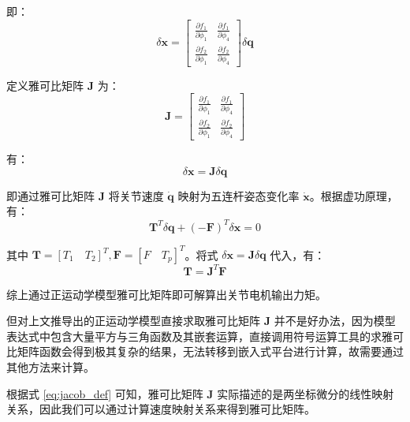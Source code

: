 即：
\begin{equation}
    \delta \boldsymbol{x} = 
    \begin{bmatrix}
        \frac{\partial f_1}{\partial \phi_1} & \frac{\partial f_1}{\partial \phi_4} \\
        \frac{\partial f_2}{\partial \phi_1} & \frac{\partial f_2}{\partial \phi_4}
    \end{bmatrix} \delta \boldsymbol{q}
\end{equation}

定义雅可比矩阵 $\boldsymbol{J}$ 为：
\begin{equation}
    \boldsymbol{J} = 
    \begin{bmatrix}
        \frac{\partial f_1}{\partial \phi_1} & \frac{\partial f_1}{\partial \phi_4} \\
        \frac{\partial f_2}{\partial \phi_1} & \frac{\partial f_2}{\partial \phi_4}
    \end{bmatrix}
    \label{eq:jacob_def}
\end{equation}

有：
\begin{equation}
    \delta \boldsymbol{x} = \boldsymbol{J} \delta \boldsymbol{q}
\end{equation}

即通过雅可比矩阵 $\boldsymbol{J}$ 将关节速度 $\dot{\boldsymbol{q}}$ 映射为五连杆姿态变化率 $\dot{\boldsymbol{x}}$。根据虚功原理，有：
\begin{equation}
    \boldsymbol{T}^T \delta \boldsymbol{q} + (-\boldsymbol{F})^T \delta \boldsymbol{x} = 0
\end{equation}

其中 $\boldsymbol{T} = [T_1 \quad T_2]^T, \boldsymbol{F} = [F \quad T_p]^T$。将式 $\delta \boldsymbol{x} = \boldsymbol{J} \delta \boldsymbol{q}$ 代入，有：
\begin{equation}
    \boldsymbol{T} = \boldsymbol{J}^T \boldsymbol{F}
\end{equation}

综上通过正运动学模型雅可比矩阵即可解算出关节电机输出力矩。

但对上文推导出的正运动学模型直接求取雅可比矩阵 $\boldsymbol{J}$ 并不是好办法，因为模型表达式中包含大量平方与三角函数及其嵌套运算，直接调用符号运算工具的求雅可比矩阵函数会得到极其复杂的结果，无法转移到嵌入式平台进行计算，故需要通过其他方法来计算。

根据式 \eqref{eq:jacob_def} 可知，雅可比矩阵 $\boldsymbol{J}$ 实际描述的是两坐标微分的线性映射关系，因此我们可以通过计算速度映射关系来得到雅可比矩阵。

